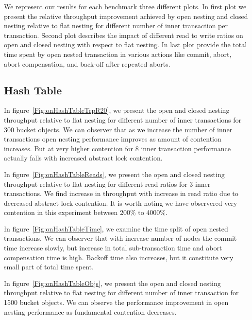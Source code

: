 \documentclass[12pt,english]{report}
\begin{document}
We represent our results for each benchmark three different plots. In first plot we present the relative throughput improvement achieved by open nesting and closed nesting relative to flat nesting for different number of inner transaction per transaction. Second plot describes the impact of different read to write ratios on open and closed nesting with respect to flat nesting. In last plot provide the total time spent by open nested transaction in various actions like commit, abort, abort compensation, and back-off after repeated aborts. 

\subsection{Hash Table}

In figure~\ref{Fig:onHashTableTrpR20}, we present the open and closed nesting throughput relative to flat nesting for different number of inner transactions for 300 bucket objects. We can observer that as we increase the number of inner transactions open nesting performance improves as amount of contention increases. But at very higher contention for 8 inner transaction performance actually falls with increased abstract lock contention. 

In figure~\ref{Fig:onHashTableReads}, we present the open and closed nesting throughput relative to flat nesting for different read ratios for 3 inner transactions. We find increase in throughput with increase in read ratio due to decreased abstract lock contention. It is worth noting we have observered very contention in this experiment between 200\% to 4000\%. 

In figure~\ref{Fig:onHashTableTime}, we examine the time split of open nested transactions. We can observer 
that with increase number of nodes the commit time increase slowly, but increase in total sub-transaction time and abort compensation time is high. Backoff time also increases, but it constitute very small part of total time spent.  

In figure~\ref{Fig:onHashTableObjs}, we present the open and closed nesting throughput relative to flat nesting for different number of inner transaction for 1500 bucket objects. We can observe the performance improvement in open nesting performance as fundamental contention decreases.
\end{document}
